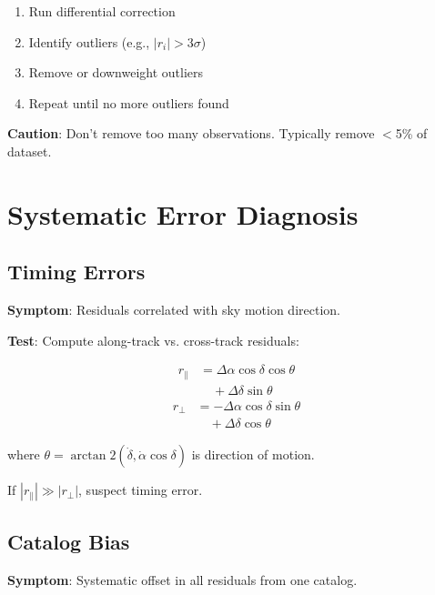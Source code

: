 \begin{enumerate}
    \item Run differential correction
    \item Identify outliers (e.g., $|r_i| > 3\sigma$)
    \item Remove or downweight outliers
    \item Repeat until no more outliers found
\end{enumerate}

\textbf{Caution}: Don't remove too many observations. Typically remove $<$5\% of dataset.

\section{Systematic Error Diagnosis}

\subsection{Timing Errors}

\textbf{Symptom}: Residuals correlated with sky motion direction.

\textbf{Test}: Compute along-track vs. cross-track residuals:

\begin{equation}
\begin{split}
    r_{\parallel} &= \Delta\alpha \cos\delta \cos\theta \\
                  &\quad + \Delta\delta \sin\theta
\end{split}
\end{equation}
\begin{equation}
\begin{split}
    r_{\perp} &= -\Delta\alpha \cos\delta \sin\theta \\
              &\quad + \Delta\delta \cos\theta
\end{split}
\end{equation}

where $\theta = \arctan2(\dot{\delta}, \dot{\alpha}\cos\delta)$ is direction of motion.

If $|r_{\parallel}| \gg |r_{\perp}|$, suspect timing error.

\subsection{Catalog Bias}

\textbf{Symptom}: Systematic offset in all residuals from one catalog.

